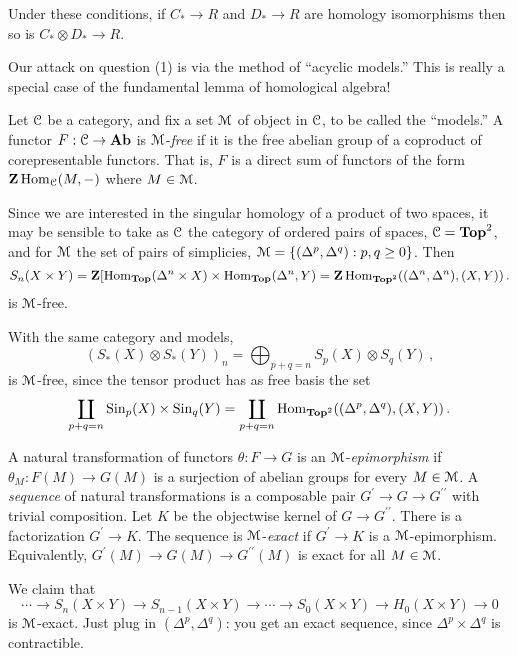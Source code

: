 \begin{corollary}\label{acyclic-tensor}
Under these conditions, if $C_\ast\to R$ and $D_\ast\to R$ are homology
isomorphisms then so is $C_\ast\otimes D_\ast\to R$. 
\end{corollary}

Our attack on question (1) is via the method of ``acyclic models.'' This is
really a special case of the fundamental lemma of homological algebra!

\begin{definition}
Let $\mathcal C$ be a category, and fix a set $\mathcal M$ of object in $\mathcal C$, 
to be called the ``models.'' 
A functor $F:\mathcal C\to\mathbf{Ab}$ is $\mathcal M$-{\em free} if it is the free abelian 
group of a coproduct of corepresentable functors. That is, $F$ is a 
direct sum of functors of the form $\mathbf Z\operatorname{Hom}_\mathcal C(M,-)$ where $M\in\mathcal M$.
\end{definition}
\begin{example}
Since we are interested in the singular homology of a product of two spaces, 
it may be sensible to take as $\mathcal C$ the category of ordered pairs of spaces,
$\mathcal C=\mathbf{Top}^2$, and for $\mathcal M$ the set of pairs of
simplicies, $\mathcal M=\{(\Delta^p,\Delta^q):p,q\geq0\}$. Then 
\[
S_n(X\times Y)=\mathbf Z[\operatorname{Hom}_\mathbf{Top}(\Delta^n\times X)\times
\operatorname{Hom}_{\mathbf{Top}}(\Delta^n,Y)=
\mathbf Z\operatorname{Hom}_{\mathbf{Top}^2}((\Delta^n,\Delta^n),(X,Y))\,.
\]
is $\mathcal M$-free.
\end{example}
\begin{example}
With the same category and models, 
\[
(S_*(X)\otimes S_*(Y))_n=\bigoplus_{p+q=n}S_p(X)\otimes S_q(Y)\,,
\]
is $\mathcal M$-free, since the tensor product has as free basis the set
\[
\coprod_{p+q=n}\mathrm{Sin}_p(X)\times\mathrm{Sin}_q(Y)
=\coprod_{p+q=n}\operatorname{Hom}_{\mathbf{Top}^2}((\Delta^p,\Delta^q),(X,Y))\,.
\]
\end{example}
\begin{definition}
A natural transformation of functors $\theta:F\to G$ is an $\mathcal M$-{\em epimorphism} if $\theta_M:F(M)\to G(M)$ is a surjection of abelian groups for every $M\in\mathcal M$. A {\em sequence} of natural transformations is a composable pair 
$G^\prime\to G\to G^{\prime\prime}$ with trivial composition. 
Let $K$ be the objectwise kernel of $G\to G^{\prime\prime}$. There is a factorization $G^\prime\to K$. The sequence is $\mathcal M$-{\em exact} if $G^\prime\to K$ is a $\mathcal M$-epimorphism. Equivalently, $G^\prime(M)\to G(M)\to G^{\prime\prime}(M)$ is exact for all $M\in\mathcal M$.
\end{definition}
\begin{example}
We claim that 
\[
\cdots\to S_n(X\times Y)\to S_{n-1}(X\times Y)\to\cdots\to S_0(X\times Y)\to H_0(X\times Y)\to 0
\]
is $\mathcal M$-exact. Just plug in $(\Delta^p,\Delta^q)$: you get an exact sequence, since $\Delta^p\times\Delta^q$ is contractible.
\end{example}
